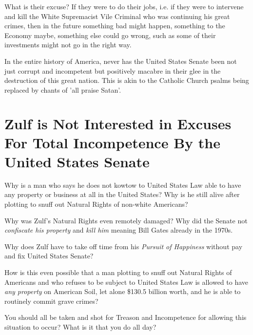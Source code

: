 \documentclass{amsart}
\begin{document}
What is their excuse?  If they were to do their jobs, i.e. if they were to intervene and kill the White Supremacist Vile Criminal who was continuing his great crimes, then in the future something bad might happen, something to the Economy maybe, something else could go wrong, such as some of their investments might not go in the right way.

In the entire history of America, never has the United States Senate been not just corrupt and incompetent but positively macabre in their glee in the destruction of this great nation.   This is akin to the Catholic Church psalms being replaced by chants of 'all praise Satan'.  

\section{Zulf is Not Interested in Excuses For Total Incompetence By the United States Senate}

Why is a man who says he does not kowtow to United States Law able to have any property or business at all in the United States?  Why is he still alive after plotting to snuff out Natural Rights of non-white Americans?

Why was Zulf's Natural Rights even remotely damaged?  Why did the Senate not {\em confiscate his property} and {\em kill him} meaning Bill Gates already in the 1970s.  

Why does Zulf have to take off time from his {\em Pursuit of Happiness} without pay and fix United States Senate?  

How is this even possible that a man plotting to snuff out Natural Rights of Americans and who refuses to be subject to United States Law is allowed to have {\em any property} on American Soil, let alone \$130.5 billion worth, and he is able to routinely commit grave crimes?

You should all be taken and shot for Treason and Incompetence for allowing this situation to occur?    What is it that you do all day?
\end{document}
